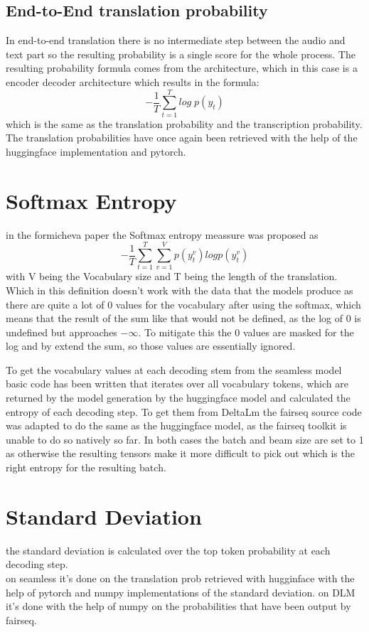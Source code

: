 \subsection{End-to-End translation probability}
In end-to-end translation there is no intermediate step between the audio and text part so the resulting probability is a single score for the whole process.
The resulting probability formula comes from the architecture, which in this case is a encoder decoder architecture which results in the formula: $$-\frac{1}{T}\sum_{t=1}^T log\; p(y_t)$$ which is the same as the translation probability and the transcription probability.
The translation probabilities have once again been retrieved with the help of the huggingface implementation and pytorch. 

\section{Softmax Entropy}
in the formicheva \cite{fomicheva2020unsupervised} paper the Softmax entropy meassure was proposed as $$-\frac{1}{T}\sum_{t=1}^T\sum_{v=1}^Vp(y_t^v)logp(y_t^v)$$ with V being the Vocabulary size and T being the length of the translation. Which in this definition doesn't work with the data that the models produce as there are quite a lot of 0 values for the vocabulary after using the softmax, which means that the result of the sum like that would not be defined, as the log of 0 is undefined but approaches $-\infty$. To mitigate this the 0 values are masked for the log and by extend the sum, so those values are essentially ignored. 

To get the vocabulary values at each decoding stem from the seamless model basic code has been written that iterates over all vocabulary tokens, which are returned by the model generation by the huggingface model and calculated the entropy of each decoding step.
To get them from DeltaLm the fairseq source code was adapted to do the same as the huggingface model, as the fairseq toolkit is unable to do so natively so far. 
In both cases the batch and beam size are set to 1 as otherwise the resulting tensors make it more difficult to pick out which is the right entropy for the resulting batch. 

\section{Standard Deviation}
the standard deviation is calculated over the top token probability at each decoding step.\\
on seamless it's done on the translation prob retrieved with hugginface with the help of pytorch and numpy implementations of the standard deviation.
on DLM it's done with the help of numpy on the probabilities that have been output by fairseq. 


